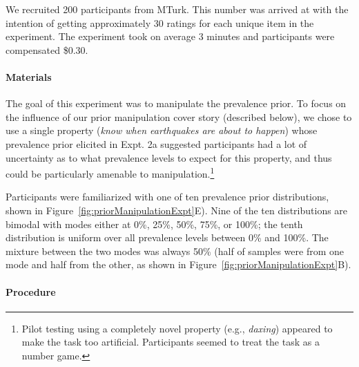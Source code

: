 \documentclass[,man,floatsintext]{apa6}
\let\oldparagraph\paragraph
\renewcommand{\paragraph}[1]{\oldparagraph{#1}\mbox{}}
\let\rmarkdownfootnote\footnote%
\def\footnote{\protect\rmarkdownfootnote}
\theoremstyle{definition}
\theoremstyle{definition}
\theoremstyle{definition}
\theoremstyle{remark}
\begin{document}
We recruited 200 participants from MTurk. This number was arrived at
with the intention of getting approximately 30 ratings for each unique
item in the experiment. The experiment took on average 3 minutes and
participants were compensated \$0.30.

\hypertarget{materials-1}{%
\paragraph{Materials}\label{materials-1}}

The goal of this experiment was to manipulate the prevalence prior. To
focus on the influence of our prior manipulation cover story (described
below), we chose to use a single property (\emph{know when earthquakes
are about to happen}) whose prevalence prior elicited in Expt. 2a
suggested participants had a lot of uncertainty as to what prevalence
levels to expect for this property, and thus could be particularly
amenable to manipulation.\footnote{Pilot testing using a completely
  novel property (e.g., \emph{daxing}) appeared to make the task too
  artificial. Participants seemed to treat the task as a number game. }

Participants were familiarized with one of ten prevalence prior
distributions, shown in Figure~\ref{fig:priorManipulationExpt}E). Nine
of the ten distributions are bimodal with modes either at 0\%, 25\%,
50\%, 75\%, or 100\%; the tenth distribution is uniform over all
prevalence levels between 0\% and 100\%. The mixture between the two
modes was always 50\% (half of samples were from one mode and half from
the other, as shown in Figure~\ref{fig:priorManipulationExpt}B).

\hypertarget{procedure}{%
\paragraph{Procedure}\label{procedure}}
\end{document}
